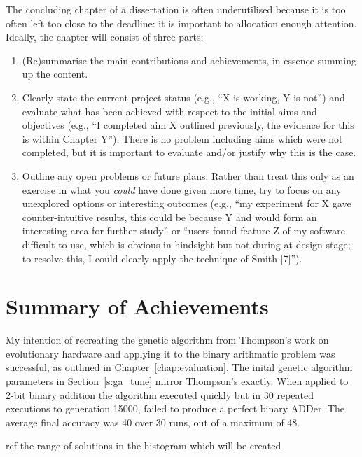 \noindent
{
	\color{red}
The concluding chapter of a dissertation is often underutilised because it
is too often left too close to the deadline: it is important to allocation
enough attention.  Ideally, the chapter will consist of three parts:

\begin{enumerate}
\item (Re)summarise the main contributions and achievements, in essence
      summing up the content.
\item Clearly state the current project status (e.g., ``X is working, Y
      is not'') and evaluate what has been achieved with respect to the
      initial aims and objectives (e.g., ``I completed aim X outlined
      previously, the evidence for this is within Chapter Y'').  There
      is no problem including aims which were not completed, but it is
      important to evaluate and/or justify why this is the case.
\item Outline any open problems or future plans.  Rather than treat this
      only as an exercise in what you {\em could} have done given more
      time, try to focus on any unexplored options or interesting outcomes
      (e.g., ``my experiment for X gave counter-intuitive results, this
      could be because Y and would form an interesting area for further
      study'' or ``users found feature Z of my software difficult to use,
      which is obvious in hindsight but not during at design stage; to
      resolve this, I could clearly apply the technique of Smith [7]'').
\end{enumerate}
}

\section{Summary of Achievements}
My intention of recreating the genetic algorithm from Thompson's work on
evolutionary hardware \cite{10.1007/3-540-63173-9_61} and applying it to the
binary arithmatic problem was successful, as outlined in Chapter~\ref{chap:evaluation}.
The inital genetic algorithm parameters in Section~\ref{s:ga_tune} mirror
Thompson's exactly. When applied to 2-bit binary addition the algorithm
executed quickly but in 30 repeated executions to generation 15000, failed to produce a perfect
binary ADDer. The average final accuracy was 40 over 30 runs, out of a maximum of 48.

\todo ref the range of solutions in the histogram which will be created

